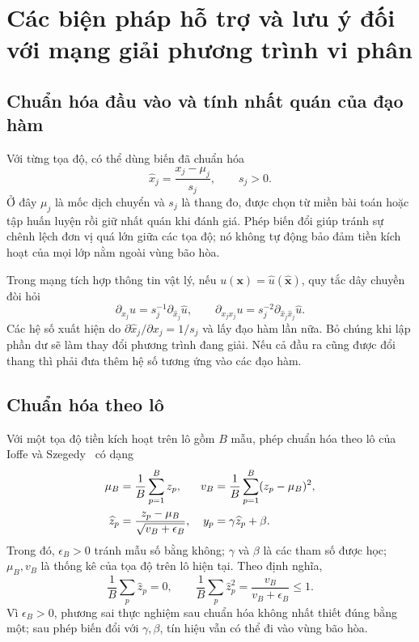 \section{Các biện pháp hỗ trợ và lưu ý đối với mạng giải phương trình vi phân}
\label{kt:sec:practical}

\subsection{Chuẩn hóa đầu vào và tính nhất quán của đạo hàm}

Với từng tọa độ, có thể dùng biến đã chuẩn hóa
\begin{equation}
 \widehat x_j=\frac{x_j-\mu_j}{s_j},\qquad s_j>0.
 \label{kt:eq:input-scaling}
\end{equation}
Ở đây $\mu_j$ là mốc dịch chuyển và $s_j$ là thang đo, được chọn
từ miền bài toán hoặc tập huấn luyện rồi giữ nhất quán khi đánh
giá. Phép biến đổi giúp tránh sự chênh lệch đơn vị quá lớn giữa
các tọa độ; nó không tự động bảo đảm tiền kích hoạt của mọi lớp
nằm ngoài vùng bão hòa.

Trong mạng tích hợp thông tin vật lý, nếu
$u(\mathbf x)=\widehat u(\widehat{\mathbf x})$, quy tắc dây chuyền
đòi hỏi
\begin{equation}
 \partial_{x_j}u=s_j^{-1}\partial_{\widehat x_j}\widehat u,
 \qquad
 \partial_{x_jx_j}u=s_j^{-2}
                   \partial_{\widehat x_j\widehat x_j}\widehat u.
 \label{kt:eq:pde-scaling}
\end{equation}
Các hệ số xuất hiện do
$\partial\widehat x_j/\partial x_j=1/s_j$ và lấy đạo hàm lần
nữa. Bỏ chúng khi lập phần dư sẽ làm thay đổi phương trình đang
giải. Nếu cả đầu ra cũng được đổi thang thì phải đưa thêm hệ số
tương ứng vào các đạo hàm.

\subsection{Chuẩn hóa theo lô}

Với một tọa độ tiền kích hoạt trên lô gồm $B$ mẫu, phép chuẩn hóa
theo lô của Ioffe và Szegedy~\cite{ioffe2015} có dạng
\begin{align}
 \mu_B&=\frac1B\sum_{p=1}^{B}z_p,&
 v_B&=\frac1B\sum_{p=1}^{B}(z_p-\mu_B)^2,\notag\\
 \widehat z_p&=\frac{z_p-\mu_B}{\sqrt{v_B+\epsilon_B}},&
 y_p&=\gamma\widehat z_p+\beta.
 \label{kt:eq:batch-normalization}
\end{align}
Trong đó, $\epsilon_B>0$ tránh mẫu số bằng không; $\gamma$ và
$\beta$ là các tham số được học; $\mu_B,v_B$ là thống kê của tọa
độ trên lô hiện tại. Theo định nghĩa,
\begin{equation}
 \frac1B\sum_p\widehat z_p=0,\qquad
 \frac1B\sum_p\widehat z_p^2=\frac{v_B}{v_B+\epsilon_B}\leq1.
 \label{kt:eq:bn-moments}
\end{equation}
Vì $\epsilon_B>0$, phương sai thực nghiệm sau chuẩn hóa không
nhất thiết đúng bằng một; sau phép biến đổi với $\gamma,\beta$,
tín hiệu vẫn có thể đi vào vùng bão hòa.

